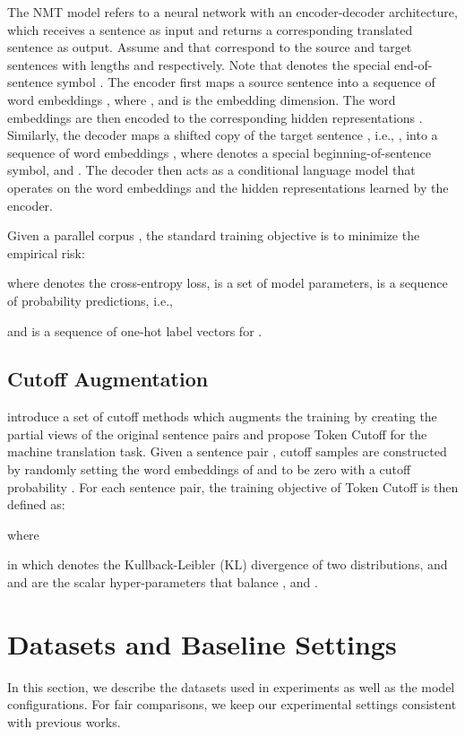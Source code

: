 \documentclass[11pt]{article}
\begin{document}
The NMT model refers to a neural network with an encoder-decoder architecture, which receives a sentence as input and returns a corresponding translated sentence as output. Assume  and  that correspond to the source and target sentences with lengths  and  respectively. Note that  denotes the special end-of-sentence symbol . The encoder first maps a source sentence  into a sequence of word embeddings , where , and  is the embedding dimension. The word embeddings are then encoded to the corresponding hidden representations . Similarly, the decoder maps a shifted copy of the target sentence , i.e., , into a sequence of word embeddings , where  denotes a special beginning-of-sentence symbol, and . The decoder then acts as a conditional language model that operates on the word embeddings  and the hidden representations  learned by the encoder.

Given a parallel corpus , the standard training objective is to minimize the empirical risk:

where  denotes the cross-entropy loss,  is a set of model parameters,  is a sequence of probability predictions, i.e., 

and  is a sequence of one-hot label vectors for . 

\subsection{Cutoff Augmentation}

\citet{shen2020simple} introduce a set of cutoff methods which augments the training by creating the partial views of the original sentence pairs and propose Token Cutoff for the machine translation task. Given a sentence pair ,  cutoff samples  are constructed by randomly setting the word embeddings of  and  to be zero with a cutoff probability . For each sentence pair, the training objective of Token Cutoff is then defined as:

where




in which  denotes the Kullback-Leibler (KL) divergence of two distributions, and  and  are the scalar hyper-parameters that balance ,  and .


\section{Datasets and Baseline Settings}\label{data_baseline}

In this section, we describe the datasets used in experiments as well as the model configurations. For fair comparisons, we keep our experimental settings consistent with previous works.
\end{document}
